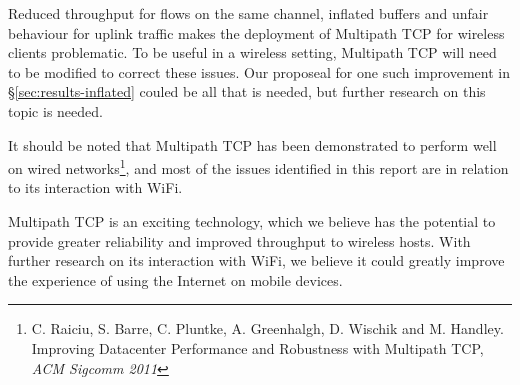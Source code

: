 Reduced throughput
for flows on the same channel, inflated buffers and unfair behaviour for uplink
traffic makes the deployment of Multipath TCP for wireless clients problematic. To be useful in a
wireless setting, Multipath TCP will need to be modified to correct these issues.
Our proposeal for one such improvement in
\S\ref{sec:results-inflated}
couled be all that is needed, but further research on this topic is needed.

It should be noted that Multipath TCP has been demonstrated to perform
well on wired networks\footnote{C. Raiciu, S. Barre, C. Pluntke, A. Greenhalgh, 
D. Wischik and M. Handley. Improving Datacenter Performance and Robustness with 
Multipath TCP, \textit{ACM Sigcomm 2011}}, and most of the issues identified
in this report are in relation to its interaction with WiFi.

Multipath TCP is an exciting technology, which we believe has the potential to 
provide greater reliability and improved throughput to wireless hosts. With
further research on its interaction with WiFi, we believe it could greatly improve the
experience of using the Internet on mobile devices.

